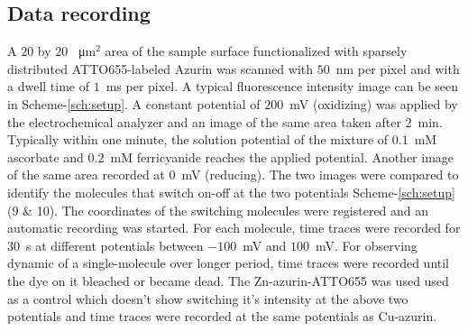 \documentclass[journal=jacsat,manuscript=article]{achemso}
\begin{document}
\subsection{Data recording}
A $20$ by $20$ \SI{}{\micro\metre}$^2$ area of the sample surface functionalized with sparsely distributed ATTO655-labeled Azurin was scanned with $50$~nm per pixel and with a dwell time of $1$~ms per pixel. A typical fluorescence intensity image can be seen in Scheme-\ref{sch:setup}. A constant potential of $200$~mV (oxidizing) was applied by the electrochemical analyzer and an image of the same area taken after $2$~min. Typically within one minute, the solution potential of the mixture of $0.1$~mM ascorbate and $0.2$~mM ferricyanide reaches the applied potential. Another image of the same area recorded at $0$~mV (reducing). The two images were compared to identify the molecules that switch on-off at the two potentials Scheme-\ref{sch:setup} (9 \& 10). The coordinates of the switching molecules were registered and an automatic recording was started. For each molecule, time traces were recorded for $30$~s at different potentials between $-100$~mV and $100$~mV. For observing dynamic of a single-molecule over longer period, time traces were recorded until the dye on it bleached or became dead. The Zn-azurin-ATTO655 was used used as a control which doesn't show switching it's intensity at the above two potentials and time traces were recorded at the same potentials as Cu-azurin.
\end{document}
